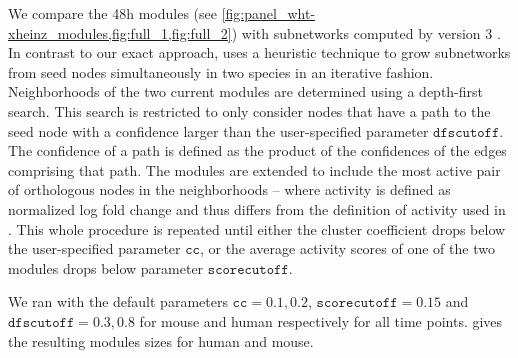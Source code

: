 We compare the \unit{48}{h} \xheinz{} modules (see \cref{fig:panel_wht-xheinz_modules,fig:full_1,fig:full_2}) with subnetworks computed by \nexus{} version 3 \parencite{deshpande2010scalable}.
In contrast to our exact approach, \nexus{} uses a heuristic technique to grow subnetworks from seed nodes simultaneously in two species in an iterative fashion.
Neighborhoods of the two current modules are determined using a depth-first search.
This search is restricted to only consider nodes that have a path to the seed node with a confidence larger than the user-specified parameter $\mathtt{dfscutoff}$.
The confidence of a path is defined as the product of the confidences of the edges comprising that path.
The modules are extended to include the most active pair of orthologous nodes in the neighborhoods -- where activity is defined as normalized log fold change and thus differs from the definition of activity used in \xheinz{}.
This whole procedure is repeated until either the cluster coefficient drops below the user-specified parameter $\mathtt{cc}$, or the average activity scores of one of the two modules drops below parameter $\mathtt{scorecutoff}$.

We ran \nexus{} with the default parameters $\mathtt{cc = 0.1,0.2}$, $\mathtt{scorecutoff=0.15}$ and $\mathtt{dfscutoff=0.3,0.8}$ for mouse and human respectively for all time points.  gives the resulting modules sizes for human and mouse.

\begin{table}[h]
	\centering
	\caption[Modules calculated with \nexus{} for all time points]{\textbf{Modules calculated with \nexus{} for all time points.}
	Shown are the sizes in number of nodes of the first 15 representative solutions and the average sizes for the human subnetwork and for the mouse subnetwork in brackets.
	The last column lists the number of solutions for each time point.
	No solutions were obtained for time points \unit{24}{h} and \unit{72}{h}.
	}
	\label{tab:nexus_all}
\end{table}

